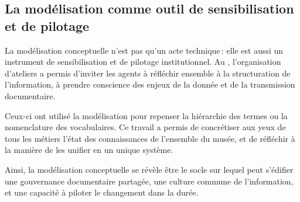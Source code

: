 \subsection{La modélisation comme outil de sensibilisation et de pilotage}

La modélisation conceptuelle n’est pas qu’un acte technique : elle est aussi un instrument de sensibilisation et de pilotage institutionnel. Au \mae, l’organisation d’ateliers a permis d’inviter les agents à réfléchir ensemble à la structuration de l’information, à prendre conscience des enjeux de la donnée et de la transmission documentaire.

Ceux-ci ont utilisé la modélisation pour repenser la hiérarchie des termes ou la nomenclature des vocabulaires. Ce travail a permis de concrétiser aux yeux de tous les métiers l'état des connaissances de l'ensemble du musée, et de réfléchir à la manière de les unifier en un unique système.

Ainsi, la modélisation conceptuelle se révèle être le socle sur lequel peut s’édifier une gouvernance documentaire partagée, une culture commune de l’information, et une capacité à piloter le changement dans la durée.